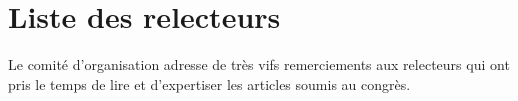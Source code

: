 
\chapter{Liste des relecteurs}

Le comité d'organisation adresse de très vifs remerciements aux relecteurs qui ont pris le temps de lire et d'expertiser les articles soumis au congrès.

\vspace{1em}

\begin{center}

\end{center}

